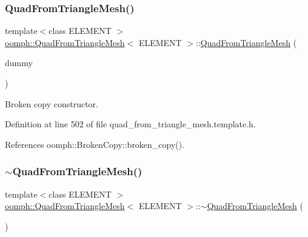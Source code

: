 \mbox{\label{classoomph_1_1QuadFromTriangleMesh_adc45cf7389f505a2f05d477474b2dcbb}} 
\subsubsection{\texorpdfstring{Quad\+From\+Triangle\+Mesh()}{QuadFromTriangleMesh()}\hspace{0.1cm}{\footnotesize\ttfamily [4/4]}}
{\footnotesize\ttfamily template$<$class E\+L\+E\+M\+E\+NT $>$ \\
\hyperlink{classoomph_1_1QuadFromTriangleMesh}{oomph\+::\+Quad\+From\+Triangle\+Mesh}$<$ E\+L\+E\+M\+E\+NT $>$\+::\hyperlink{classoomph_1_1QuadFromTriangleMesh}{Quad\+From\+Triangle\+Mesh} (\begin{DoxyParamCaption}\item[{const \hyperlink{classoomph_1_1QuadFromTriangleMesh}{Quad\+From\+Triangle\+Mesh}$<$ E\+L\+E\+M\+E\+NT $>$ \&}]{dummy }\end{DoxyParamCaption})\hspace{0.3cm}{\ttfamily [inline]}}



Broken copy constructor. 



Definition at line 502 of file quad\+\_\+from\+\_\+triangle\+\_\+mesh.\+template.\+h.



References oomph\+::\+Broken\+Copy\+::broken\+\_\+copy().

\mbox{\label{classoomph_1_1QuadFromTriangleMesh_aa8737e7a7e845cab4fb6fd82c8f3506d}} 
\subsubsection{\texorpdfstring{$\sim$\+Quad\+From\+Triangle\+Mesh()}{~QuadFromTriangleMesh()}}
{\footnotesize\ttfamily template$<$class E\+L\+E\+M\+E\+NT $>$ \\
\hyperlink{classoomph_1_1QuadFromTriangleMesh}{oomph\+::\+Quad\+From\+Triangle\+Mesh}$<$ E\+L\+E\+M\+E\+NT $>$\+::$\sim$\hyperlink{classoomph_1_1QuadFromTriangleMesh}{Quad\+From\+Triangle\+Mesh} (\begin{DoxyParamCaption}{ }\end{DoxyParamCaption})\hspace{0.3cm}{\ttfamily [inline]}}



